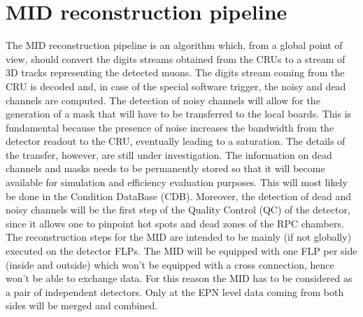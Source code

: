 \section{MID reconstruction pipeline}
The MID reconstruction pipeline is an algorithm which, from a global point of view, should convert the digits streams obtained from the CRUs to a stream of 3D tracks representing the detected muons.
The digits stream coming from the CRU is decoded and, in case of the special software trigger, the noisy and dead channels are computed.
The detection of noisy channels will allow for the generation of a mask that will have to be transferred to the local boards. 
This is fundamental because the presence of noise increases the bandwidth from the detector readout to the CRU, eventually leading to a saturation. 
The details of the transfer, however, are still under investigation. 
The information on dead channels and masks needs to be permanently stored so that it will become available for simulation and efficiency evaluation purposes. 
This will most likely be done in the Condition DataBase (CDB).
Moreover, the detection of dead and noisy channels will be the first step of the Quality Control (QC) of the detector, since it allows one to pinpoint hot spots and dead zones of the RPC chambers.
The reconstruction steps for the MID are intended to be mainly (if not globally) executed on the detector FLPs.
The MID will be equipped with one FLP per side (inside and outside) which won't be equipped with a cross connection, hence won't be able to exchange data.
For this reason the MID has to be considered as a pair of independent detectors.
Only at the EPN level data coming from both sides will be merged and combined.

